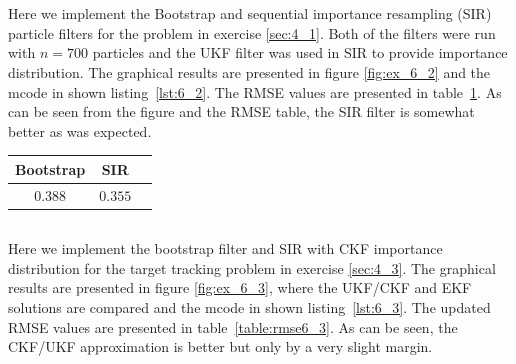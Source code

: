 \documentclass[a4paper,oneside,article]{memoir}
\newcommand{\otoprule}{\midrule[\heavyrulewidth]}
\begin{document}
\clearpage



\section{}
\subsection{}


\subsection{}\label{sec:6_2}

Here we implement the Bootstrap and sequential importance resampling (SIR) particle filters 
for the problem in exercise \ref{sec:4_1}. Both of the filters were run with $n=700$ particles and
the UKF filter was used in SIR to provide importance distribution.
The graphical results are presented in figure \ref{fig:ex_6_2} and the
mcode in shown listing~\ref{lst:6_2}. The RMSE values are presented in table~\ref{table:rmse6_2}. As can be seen
from the figure and the RMSE table, the SIR filter is somewhat better as was expected.



\begin{table}[h]
	\centering
	\begin{tabular}{c c c}
		\otoprule
		Bootstrap & SIR\\
		\midrule
		$0.388$ & $0.355$\\
		\bottomrule
	\end{tabular}
	\label{table:rmse6_2}
\end{table}

\clearpage



\subsection{}\label{sec:6_3}

Here we implement the bootstrap filter and SIR with CKF importance distribution for the target tracking problem in
exercise \ref{sec:4_3}. The graphical results are presented in figure \ref{fig:ex_6_3}, where the UKF/CKF and EKF solutions
are compared and the mcode in shown listing~\ref{lst:6_3}. The updated RMSE values are presented
in table~\ref{table:rmse6_3}. As can be seen, the CKF/UKF approximation is better but only by a very
slight margin. 
\end{document}
